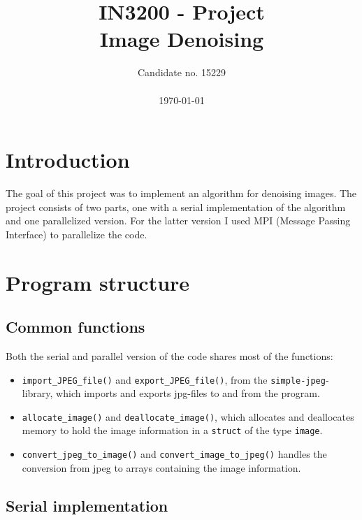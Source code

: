 \documentclass[10pt, a4paper]{amsart}
\title[Image Denoising]{IN3200 - Project \\ \large
Image Denoising}
\author[Candidate no. 15229]{Candidate no. 15229 \\ \\ \today}
\numberwithin{figure}{section}
\numberwithin{table}{section}
\begin{document}
\maketitle


\tableofcontents

\section{Introduction}
The goal of this project was to implement an algorithm for denoising images. The project consists of two parts, one with a serial implementation of the algorithm and one parallelized version. For the latter version I used MPI (Message Passing Interface) to parallelize the code.

\section{Program structure}

\subsection{Common functions}

Both the serial and parallel version of the code shares most of the functions:
\begin{itemize}
    \item \texttt{import\_JPEG\_file()} and \texttt{export\_JPEG\_file()}, from the \texttt{simple-jpeg}-library, which imports and exports jpg-files to and from the program.
    \item \texttt{allocate\_image()} and \texttt{deallocate\_image()}, which allocates and deallocates memory to hold the image information in a \texttt{struct} of the type \texttt{image}.
    \item \texttt{convert\_jpeg\_to\_image()} and \texttt{convert\_image\_to\_jpeg()} handles the conversion from jpeg to arrays containing the image information.
\end{itemize}


\subsection{Serial implementation}
\end{document}

